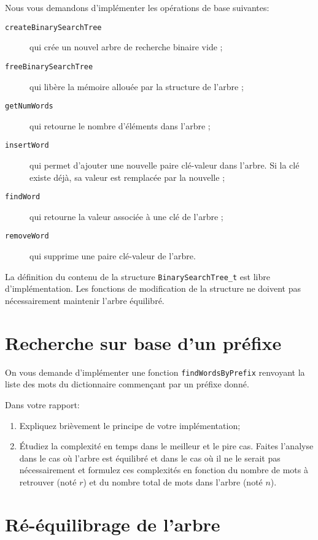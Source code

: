 \documentclass[a4paper,10pt]{article}
\begin{document}
Nous vous demandons d'implémenter les opérations de base suivantes:
\begin{description}
\item[\texttt{createBinarySearchTree}] qui crée un nouvel arbre de recherche binaire vide ;
\item[\texttt{freeBinarySearchTree}]  qui libère la mémoire allouée par la structure de l'arbre ;
\item[\texttt{getNumWords}] qui retourne le nombre d'éléments dans l'arbre ;
\item[\texttt{insertWord}] qui permet d'ajouter une nouvelle paire clé-valeur dans l'arbre. Si la clé existe déjà, sa valeur est remplacée par la nouvelle ;
\item[\texttt{findWord}] qui retourne la valeur associée à une clé de l'arbre ;
\item[\texttt{removeWord}] qui supprime une paire clé-valeur de l'arbre.
\end{description}
La définition du contenu de la structure \texttt{BinarySearchTree\_t} est libre
d'implémentation. Les fonctions de modification de la structure ne doivent pas
nécessairement maintenir l'arbre équilibré.

\section{Recherche sur base d'un préfixe}

On vous demande d'implémenter une fonction \texttt{findWordsByPrefix}
renvoyant la liste des mots du dictionnaire commençant par un préfixe
donné.

Dans votre rapport:
\begin{enumerate}
\item Expliquez brièvement le principe de votre implémentation;
\item \'Etudiez la complexité en temps dans le meilleur et le pire
  cas. Faites l'analyse dans le cas où l'arbre est équilibré et dans
  le cas où il ne le serait pas nécessairement et formulez ces
  complexités en fonction du nombre de mots à retrouver (noté $r$) et
  du nombre total de mots dans l'arbre (noté $n$).
\end{enumerate}

\section{Ré-équilibrage de l'arbre}
\end{document}
